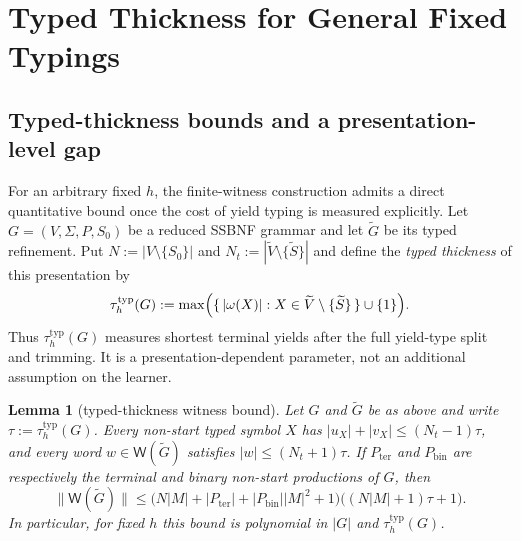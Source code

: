 \documentclass[11pt,a4paper]{article}
\newtheorem{lemma}[theorem]{Lemma}
\theoremstyle{remark}
\theoremstyle{plain}
\newcommand{\WitnessSet}{\mathsf{W}}
\begin{document}
\section{Typed Thickness for General Fixed Typings}
\label{sec:typed-thickness}

\subsection{Typed-thickness bounds and a presentation-level gap}

For an arbitrary fixed $h$, the finite-witness construction admits a direct
quantitative bound once the cost of yield typing is measured explicitly.  Let
$G=(V,\Sigma,P,S_0)$ be a reduced SSBNF grammar and let $\widetilde G$ be its typed refinement.  Put
$N:=|V\setminus\{S_0\}|$ and
$N_t:=|\widetilde V\setminus\{\widetilde S\}|$
and define the \emph{typed thickness} of this presentation by
\[
 \tau_h^{\mathrm{typ}}(G):=
 \max\Bigl(\{\,|\omega(X)|:
 X\in\widetilde V\setminus\{\widetilde S\}\,\}\cup\{1\}\Bigr).
\]
Thus $\tau_h^{\mathrm{typ}}(G)$ measures shortest terminal yields after the
full yield-type split and trimming.  It is a presentation-dependent
parameter, not an additional assumption on the learner.

\begin{lemma}[typed-thickness witness bound]
\label{lem:typed-thickness-bound}
Let $G$ and $\widetilde G$ be as above and write
$\tau:=\tau_h^{\mathrm{typ}}(G)$.  Every non-start typed symbol $X$ has
$|u_X|+|v_X|\le (N_t-1)\tau$,
and every word $w\in\WitnessSet(\widetilde G)$ satisfies
$|w|\le (N_t+1)\tau$.
If $P_{\mathrm{ter}}$ and $P_{\mathrm{bin}}$ are respectively the terminal
and binary non-start productions of $G$, then
\[
 \|\WitnessSet(\widetilde G)\|
 \le
 \bigl(N|M|+|P_{\mathrm{ter}}|
       +|P_{\mathrm{bin}}||M|^2+1\bigr)
 \bigl((N|M|+1)\tau+1\bigr).
\]
In particular, for fixed $h$ this bound is polynomial in $|G|$ and
$\tau_h^{\mathrm{typ}}(G)$.
\end{lemma}
\end{document}
